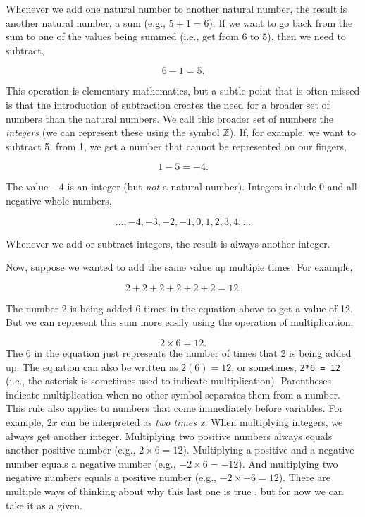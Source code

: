 \documentclass[
  openany]{krantz}
\begin{document}
Whenever we add one natural number to another natural number, the result is another natural number, a sum (e.g., \(5 + 1 = 6\)).
If we want to go back from the sum to one of the values being summed (i.e., get from \(6\) to \(5\)), then we need to subtract,

\[6 - 1 = 5.\]

This operation is elementary mathematics, but a subtle point that is often missed is that the introduction of subtraction creates the need for a broader set of numbers than the natural numbers.
We call this broader set of numbers the \emph{integers} (we can represent these using the symbol \(\mathbb{Z}\)).
If, for example, we want to subtract 5, from 1, we get a number that cannot be represented on our fingers,

\[1 - 5 = -4.\]

The value \(-4\) is an integer (but \emph{not} a natural number).
Integers include 0 and all negative whole numbers,

\[..., -4, -3, -2, -1, 0, 1, 2, 3, 4,  ...\]

Whenever we add or subtract integers, the result is always another integer.

Now, suppose we wanted to add the same value up multiple times.
For example,

\[2 + 2 + 2 + 2 + 2 + 2 = 12.\]

The number 2 is being added 6 times in the equation above to get a value of 12.
But we can represent this sum more easily using the operation of multiplication,

\[2 \times 6 = 12.\]
The 6 in the equation just represents the number of times that 2 is being added up.
The equation can also be written as \(2(6) = 12\), or sometimes, \texttt{2*6\ =\ 12} (i.e., the asterisk is sometimes used to indicate multiplication).
Parentheses indicate multiplication when no other symbol separates them from a number.
This rule also applies to numbers that come immediately before variables.
For example, \(2x\) can be interpreted as \emph{two times x}.
When multiplying integers, we always get another integer.
Multiplying two positive numbers always equals another positive number (e.g., \(2 \times 6 = 12\)).
Multiplying a positive and a negative number equals a negative number (e.g., \(-2 \times 6 = -12\)).
And multiplying two negative numbers equals a positive number (e.g., \(-2 \times -6 = 12\)).
There are multiple ways of thinking about why this last one is true \citep[see, e.g.,][ for one explanation]{Askey1999}, but for now we can take it as a given.
\end{document}

